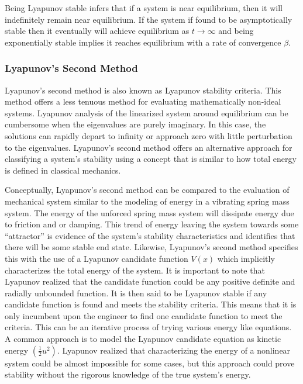 Being Lyapunov stable infers that if a system is near equilibrium, then it will indefinitely remain near equilibrium.  If the system if found to be asymptotically stable then it eventually will achieve equilibrium as $t\to \infty$ and being exponentially stable implies it reaches equilibrium with a rate of convergence $\beta$.

\subsubsection{Lyapunov's Second Method}
 
Lyapunov's second method is also known as Lyapunov stability criteria.  This method offers a less tenuous method for evaluating mathematically non-ideal systems.  Lyapunov analysis of the linearized system around equilibrium can be cumbersome when the eigenvalues are purely imaginary.  In this case, the solutions can rapidly depart to infinity or approach zero with little perturbation to the eigenvalues.  Lyapunov's second method offers an alternative approach for classifying a system's stability using a concept that is similar to how total energy is defined in classical mechanics.

Conceptually, Lyapunov's second method can be compared to the evaluation of mechanical system similar to the modeling of energy in a vibrating spring mass system.  The energy of the unforced spring mass system will dissipate energy due to friction and or damping.  This trend of energy leaving the system towards some \enquote{attractor} is evidence of the system's stability characteristics and identifies that there will be some stable end state.  Likewise, Lyapunov's second method specifies this with the use of a Lyapunov candidate function $V(x)$ which implicitly characterizes the total energy of the system.  It is important to note that Lyapunov realized that the candidate function could be any positive definite and radially unbounded function.  It is then said to be Lyapunov stable if any candidate function is found and meets the stability criteria.  This means that it is only incumbent upon the engineer to find one candidate function to meet the criteria.  This can be an iterative process of trying various energy like equations.  A common approach is to model the Lyapunov candidate equation as kinetic energy $(\frac{1}{2}u^2)$.  Lyapunov realized that characterizing the energy of a nonlinear system could be almost impossible for some cases, but this approach could prove stability without the rigorous knowledge of the true system's energy.

